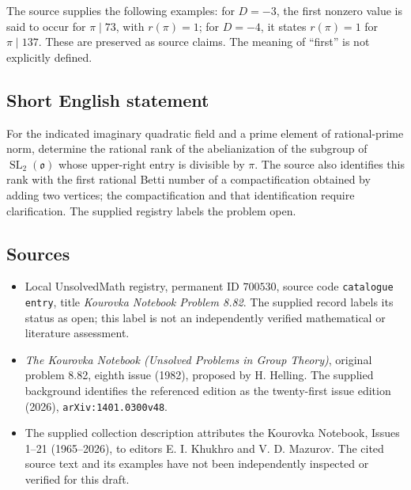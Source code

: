\documentclass[11pt]{article}
\begin{document}
The source supplies the following examples: for \(D=-3\), the first nonzero value is said to occur for \(\pi\mid73\), with \(r(\pi)=1\); for \(D=-4\), it states \(r(\pi)=1\) for \(\pi\mid137\). These are preserved as source claims. The meaning of ``first'' is not explicitly defined.
\subsection{Short English statement}
For the indicated imaginary quadratic field and a prime element of rational-prime norm, determine the rational rank of the abelianization of the subgroup of \(\operatorname{SL}_2(\mathfrak o)\) whose upper-right entry is divisible by \(\pi\). The source also identifies this rank with the first rational Betti number of a compactification obtained by adding two vertices; the compactification and that identification require clarification. The supplied registry labels the problem open.
\subsection{Sources}
\begin{itemize}
\item Local UnsolvedMath registry, permanent ID \(700530\), source code \texttt{catalogue entry}, title \emph{Kourovka Notebook Problem 8.82}. The supplied record labels its status as open; this label is not an independently verified mathematical or literature assessment.
\item \emph{The Kourovka Notebook (Unsolved Problems in Group Theory)}, original problem 8.82, eighth issue (1982), proposed by H. Helling. The supplied background identifies the referenced edition as the twenty-first issue edition (2026), \texttt{arXiv:1401.0300v48}.
\item The supplied collection description attributes the Kourovka Notebook, Issues 1--21 (1965--2026), to editors E. I. Khukhro and V. D. Mazurov. The cited source text and its examples have not been independently inspected or verified for this draft.
\end{itemize}
\end{document}
